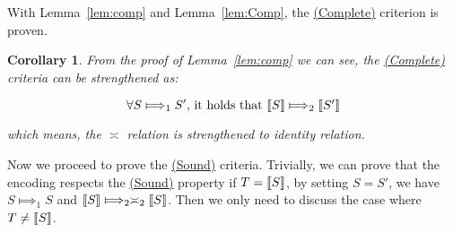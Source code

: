 \documentclass[adraft]{eptcs}
\newtheorem{coro}{Corollary}
\newcommand{\lem}[1]{Lemma~\ref{lem:#1}}
\newcommand{\plat}[1]{\raisebox{0pt}[0pt][0pt]{#1}}   %
\newcommand{\bkt}[1]{\llbracket \plat{$#1$} \rrbracket}
\newcommand{\myref}[1]{\hyperlink{lab:#1}{\scriptsize\sc (#1)}}
\begin{document}
With \lem{comp} and \lem{Comp}, the \myref{Complete} criterion is proven.


\begin{coro}
	From the proof of \lem{comp} we can see, the \myref{Complete} criteria can be strengthened as:

	\[\forall S\Longmapsto_1S'\text{, it holds that }\bkt{S}\Longmapsto_2\bkt{S'}\]

	which means, the $\asymp$ relation is strengthened to identity relation.
\end{coro}




Now we proceed to prove the \myref{Sound} criteria. Trivially, we can prove that the encoding respects the \myref{Sound} property if $T = \bkt{S}$, by setting $S = S'$, we have $S \Longmapsto_1 S$ and $\bkt{S} \Longmapsto_2 \asymp_2 \bkt{S}$. Then we only need to discuss the case where $T \neq \bkt{S}$.
\end{document}
